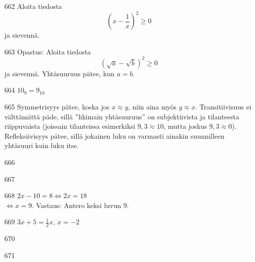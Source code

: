\begin{Vastaus}{662}
     Aloita tiedosta \[\left(x-\frac{1}{x}\right)^2 \geq 0\] ja sievennä.
    
\end{Vastaus}
\begin{Vastaus}{663}
     Opastus: Aloita tiedosta \[\left(\sqrt{a}-\sqrt{b}\right)^2 \geq 0\] ja sievennä. Yhtäsuuruus pätee, kun $a = b$.
    
\end{Vastaus}
\begin{Vastaus}{664}
	$10_9=9_{10}$
	
\end{Vastaus}
\begin{Vastaus}{665}
Symmetrisyys pätee, koska jos $x\approx y$, niin aina myös $y\approx x$. Transitiivisuus ei välttämättä päde, sillä ''likimain yhtäsuuruus'' on subjektiivista ja tilanteesta riippuvaista (joissain tilanteissa esimerkiksi $9,3\approx 10$, mutta joskus $9,3 \approx 0$). Refleksiivisyys pätee, sillä jokainen luku on varmasti ainakin suunnilleen yhtäsuuri kuin luku itse.
	
\end{Vastaus}
\begin{Vastaus}{666}
    
\end{Vastaus}
\begin{Vastaus}{667}
    
\end{Vastaus}
\begin{Vastaus}{668}
        $2x-10=8 \Leftrightarrow 2x=18$ \\ $\Leftrightarrow x=9$. Vastaus: Antero keksi luvun $9$.
    
\end{Vastaus}
\begin{Vastaus}{669}
        $3x+5=\frac12x$, $x=-2$
    
\end{Vastaus}
\begin{Vastaus}{670}
    
\end{Vastaus}
\begin{Vastaus}{671}
    
\end{Vastaus}
